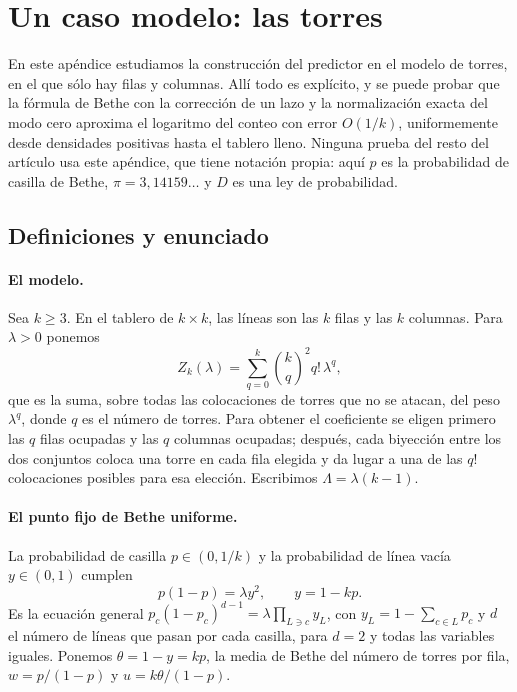 \appendix
\section{Un caso modelo: las torres}\label{sec:torres}

En este apéndice estudiamos la construcción del predictor en el modelo de torres, en el que sólo hay
filas y columnas. Allí todo es explícito, y se puede probar que la fórmula de Bethe con la corrección de
un lazo y la normalización exacta del modo cero aproxima el logaritmo del conteo con error $O(1/k)$,
uniformemente desde densidades positivas hasta el tablero lleno. Ninguna prueba del resto del artículo
usa este apéndice, que tiene notación propia: aquí $p$ es la probabilidad de casilla de Bethe,
$\pi=3{,}14159\ldots$ y $D$ es una ley de probabilidad.

\subsection{Definiciones y enunciado}

\paragraph{El modelo.}
Sea $k\ge3$. En el tablero de $k\times k$, las líneas son las $k$ filas y las $k$ columnas. Para
$\lambda>0$ ponemos
\[
 Z_k(\lambda)=\sum_{q=0}^{k}\binom kq^2q!\,\lambda^q,
\]
que es la suma, sobre todas las colocaciones de torres que no se atacan, del peso $\lambda^q$, donde $q$
es el número de torres. Para obtener
el coeficiente se eligen primero las $q$ filas ocupadas y las $q$ columnas ocupadas; después, cada
biyección entre los dos conjuntos coloca una torre en cada fila elegida y da lugar a una de las $q!$
colocaciones posibles para esa elección. Escribimos $\Lambda=\lambda(k-1)$.

\paragraph{El punto fijo de Bethe uniforme.}
La probabilidad de casilla $p\in(0,1/k)$ y la probabilidad de línea vacía $y\in(0,1)$ cumplen
\begin{equation}\label{eq:torres-punto}
 p(1-p)=\lambda y^2,\qquad y=1-kp.
\end{equation}
Es la ecuación general $p_c(1-p_c)^{d-1}=\lambda\prod_{L\ni c}y_L$, con $y_L=1-\sum_{c\in L}p_c$
y $d$ el número de líneas que pasan por cada casilla, para $d=2$ y todas las variables iguales. Ponemos
$\theta=1-y=kp$, la media de Bethe del número de torres por fila,
$w=p/(1-p)$ y $u=k\theta/(1-p)$.


